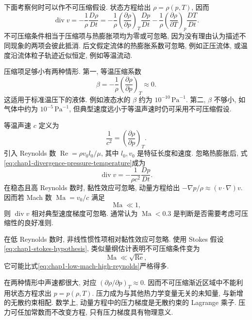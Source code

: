 下面考察何时可以作不可压缩假设. 状态方程给出 $\rho=\rho(p,T)$, 因而
\begin{equation}
\label{eq:chap1-divergence-pressure-temperature}
  \operatorname{div}v=-\frac1\rho\frac{D\rho}{Dt}
  =-\frac1\rho\left(\frac{\partial\rho}{\partial p}\right)_T\frac{Dp}{Dt}
   -\frac1\rho\left(\frac{\partial\rho}{\partial T}\right)_p\frac{DT}{Dt}.
\end{equation}
不可压缩条件相当于压缩项与热膨胀项均为零或可忽略, 因为没有理由认为描述不同现象的两项会彼此抵消. 后文假定流体的热膨胀系数可忽略, 例如正压流体, 或温度沿流体粒子轨迹近似恒定, 例如等温流动.

压缩项足够小有两种情形. 第一, 等温压缩系数
\[
  \beta=-\frac1\rho\left(\frac{\partial\rho}{\partial p}\right)_T\approx0.
\]
这适用于标准温压下的液体. 例如液态水的 $\beta$ 约为 $10^{-10}\,\mathrm{Pa}^{-1}$. 第二, $\beta$ 不够小, 如气体中约为 $10^{-5}\,\mathrm{Pa}^{-1}$, 但典型速度远小于等温声速时仍可采用不可压缩假设.

等温声速 $c$ 定义为
\[
  \frac1{c^2}=\left(\frac{\partial\rho}{\partial p}\right)_T.
\]
引入 Reynolds 数 $\operatorname{Re}=\rho v_0l_0/\mu$, 其中 $l_0,v_0$ 是特征长度和速度. 忽略热膨胀后, 式\eqref{eq:chap1-divergence-pressure-temperature}成为
\begin{equation}
\label{eq:chap1-divergence-sound-speed}
  \operatorname{div}v=-\frac1{\rho c^2}\frac{Dp}{Dt}.
\end{equation}
在稳态且高 Reynolds 数时, 黏性效应可忽略, 动量方程给出 $-\nabla p/\rho\approx(v\cdot\nabla)v$. 因而若 Mach 数 $\operatorname{Ma}=v_0/c$ 满足
\begin{equation}
\label{eq:chap1-low-mach-high-reynolds}
  \operatorname{Ma}\ll1,
\end{equation}
则 $\operatorname{div}v$ 相对典型速度梯度可忽略. 通常认为 $\operatorname{Ma}<0.3$ 是判断是否需要考虑可压缩性的良好准则.

在低 Reynolds 数时, 非线性惯性项相对黏性效应可忽略. 使用 Stokes 假设\eqref{eq:chap1-stokes-hypothesis}, 类似量纲估计表明不可压缩条件变为
\begin{equation}
\label{eq:chap1-low-mach-low-reynolds}
  \operatorname{Ma}\ll\sqrt{\operatorname{Re}},
\end{equation}
它可能比式\eqref{eq:chap1-low-mach-high-reynolds}严格得多.

在两种情形中声速都很大, 对应 $(\partial\rho/\partial p)_T\approx0$. 因而不可压缩渐近区域中不能利用状态方程求出 $p=p(\rho,T)$. 压力成为与其他热力学变量无关的未知量, 与新增的无散约束相配. 数学上, 动量方程中的压力梯度是无散约束的 Lagrange 乘子. 压力可任加常数而不改变方程, 只有压力梯度具有物理意义.

